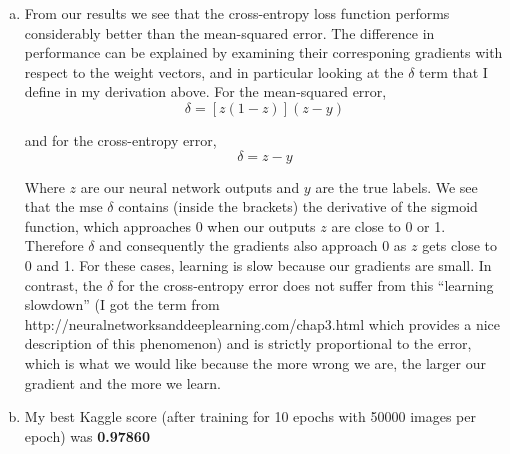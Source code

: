 \documentclass{article}
\begin{document}
\begin{enumerate}[a.]
\begin{itemize}
    \end{itemize}

  \item From our results we see that the cross-entropy loss function performs considerably better than the mean-squared error. The difference in performance can be explained by examining their corresponing gradients with respect to the weight vectors, and in particular looking at the $\delta$ term that I define in my derivation above. For the mean-squared error,
    $$\delta = \left[z(1-z)\right](z-y)$$

    and for the cross-entropy error,
    $$\delta = z - y$$

    Where $z$ are our neural network outputs and $y$ are the true labels. We see that the mse $\delta$ contains (inside the brackets) the derivative of the sigmoid function, which approaches 0 when our outputs $z$ are close to 0 or 1. Therefore $\delta$ and consequently the gradients also approach 0 as $z$ gets close to 0 and 1. For these cases, learning is slow because our gradients are small. In contrast, the $\delta$ for the cross-entropy error does not suffer from this ``learning slowdown'' (I got the term from http://neuralnetworksanddeeplearning.com/chap3.html which provides a nice description of this phenomenon) and is strictly proportional to the error, which is what we would like because the more wrong we are, the larger our gradient and the more we learn.

  \item My best Kaggle score (after training for 10 epochs with 50000 images per epoch) was \textbf{0.97860}
\end{enumerate}
\end{document}
